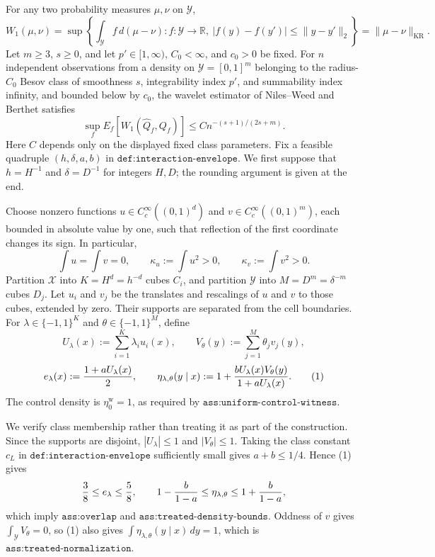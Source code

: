 For any two probability measures \(\mu,\nu\) on \(\mathcal Y\),
\[
 W_1(\mu,\nu)
 =\sup\left\{\int_{\mathcal Y} f\,d(\mu-\nu):
       f:\mathcal Y\to\mathbb R,\ |f(y)-f(y')|\leq\lVert y-y'\rVert_2\right\}
 =\lVert\mu-\nu\rVert_{\mathrm{KR}}.
\]
Let \(m\geq3\), \(s\geq0\), and let \(p'\in[1,\infty)\), \(C_0<\infty\), and \(c_0>0\) be fixed.  For \(n\) independent observations from a density on \(\mathcal Y=[0,1]^m\) belonging to the radius-\(C_0\) Besov class of smoothness \(s\), integrability index \(p'\), and summability index infinity, and bounded below by \(c_0\), the wavelet estimator of Niles--Weed and Berthet satisfies
\[
 \sup_f E_f\!\left[W_1(\widehat Q_f,Q_f)\right]
 \leq C n^{-(s+1)/(2s+m)}.
\]
Here \(C\) depends only on the displayed fixed class parameters.
Fix a feasible quadruple \((h,\delta,a,b)\) in \(\texttt{def:interaction-envelope}\).  We first suppose that \(h=H^{-1}\) and \(\delta=D^{-1}\) for integers \(H,D\); the rounding argument is given at the end.

Choose nonzero functions \(u\in C_c^\infty((0,1)^d)\) and \(v\in C_c^\infty((0,1)^m)\), each bounded in absolute value by one, such that reflection of the first coordinate changes its sign.  In particular,
\[
 \int u=\int v=0,\qquad
 \kappa_u:=\int u^2>0,\qquad \kappa_v:=\int v^2>0.
\]
Partition \(\mathcal X\) into \(K=H^d=h^{-d}\) cubes \(C_i\), and partition \(\mathcal Y\) into \(M=D^m=\delta^{-m}\) cubes \(D_j\).  Let \(u_i\) and \(v_j\) be the translates and rescalings of \(u\) and \(v\) to those cubes, extended by zero.  Their supports are separated from the cell boundaries.  For \(\lambda\in\{-1,1\}^K\) and \(\theta\in\{-1,1\}^M\), define
\[
 U_\lambda(x):=\sum_{i=1}^K\lambda_i u_i(x),\qquad
 V_\theta(y):=\sum_{j=1}^M\theta_jv_j(y),
\]
\[
 e_\lambda(x):={1+aU_\lambda(x)\over2},\qquad
 \eta_{\lambda,\theta}(y\mid x)
 :=1+{bU_\lambda(x)V_\theta(y)\over1+aU_\lambda(x)}.
 \tag{1}
\]
The control density is \(\eta_0^{\mathrm w}=1\), as required by \(\texttt{ass:uniform-control-witness}\).

We verify class membership rather than treating it as part of the construction.  Since the supports are disjoint, \(|U_\lambda|\leq1\) and \(|V_\theta|\leq1\).  Taking the class constant \(c_L\) in \(\texttt{def:interaction-envelope}\) sufficiently small gives \(a+b\leq1/4\).  Hence (1) gives
\[
 {3\over8}\leq e_\lambda\leq {5\over8},\qquad
 1-{b\over1-a}\leq\eta_{\lambda,\theta}
 \leq1+{b\over1-a},
\]
which imply \(\texttt{ass:overlap}\) and \(\texttt{ass:treated-density-bounds}\).  Oddness of \(v\) gives \(\int_{\mathcal Y}V_\theta=0\), so (1) also gives \(\int\eta_{\lambda,\theta}(y\mid x)\,dy=1\), which is \(\texttt{ass:treated-normalization}\).

